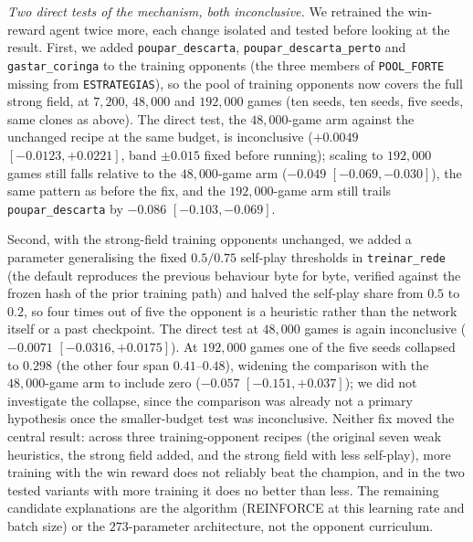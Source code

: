 \documentclass[11pt]{article}
\begin{document}
\emph{Two direct tests of the mechanism, both inconclusive.} We retrained the win-reward agent twice more, each change isolated and tested before looking at the result. First, we added \texttt{poupar\_descarta}, \texttt{poupar\_descarta\_perto} and \texttt{gastar\_coringa} to the training opponents (the three members of \texttt{POOL\_FORTE} missing from \texttt{ESTRATEGIAS}), so the pool of training opponents now covers the full strong field, at $7{,}200$, $48{,}000$ and $192{,}000$ games (ten seeds, ten seeds, five seeds, same clones as above). The direct test, the $48{,}000$-game arm against the unchanged recipe at the same budget, is inconclusive ($+0.0049$ $[-0.0123,+0.0221]$, band $\pm0.015$ fixed before running); scaling to $192{,}000$ games still falls relative to the $48{,}000$-game arm ($-0.049$ $[-0.069,-0.030]$), the same pattern as before the fix, and the $192{,}000$-game arm still trails \texttt{poupar\_descarta} by $-0.086$ $[-0.103,-0.069]$.

Second, with the strong-field training opponents unchanged, we added a parameter generalising the fixed $0.5/0.75$ self-play thresholds in \texttt{treinar\_rede} (the default reproduces the previous behaviour byte for byte, verified against the frozen hash of the prior training path) and halved the self-play share from $0.5$ to $0.2$, so four times out of five the opponent is a heuristic rather than the network itself or a past checkpoint. The direct test at $48{,}000$ games is again inconclusive ($-0.0071$ $[-0.0316,+0.0175]$). At $192{,}000$ games one of the five seeds collapsed to $0.298$ (the other four span $0.41$--$0.48$), widening the comparison with the $48{,}000$-game arm to include zero ($-0.057$ $[-0.151,+0.037]$); we did not investigate the collapse, since the comparison was already not a primary hypothesis once the smaller-budget test was inconclusive. Neither fix moved the central result: across three training-opponent recipes (the original seven weak heuristics, the strong field added, and the strong field with less self-play), more training with the win reward does not reliably beat the champion, and in the two tested variants with more training it does no better than less. The remaining candidate explanations are the algorithm (REINFORCE at this learning rate and batch size) or the $273$-parameter architecture, not the opponent curriculum.
\end{document}

